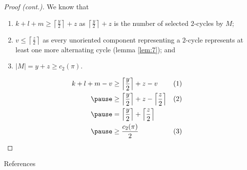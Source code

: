 \documentclass{beamer}
\theoremstyle{definition}
\begin{document}
\begin{frame}

\begin{proof}[Proof (cont.)]
We know that
\begin{enumerate}
    \item $k+l+m \geq \left\lceil \frac{y}{2} \right\rceil + z$ as $\left\lceil \frac{y}{2} \right\rceil + z$ is the number of selected $2$-cycles by $M$\pause;
    \item $v \leq \left\lceil \frac{z}{2} \right\rceil$ as every unoriented component representing a $2$-cycle represents at least one more alternating cycle (lemma \ref{lem:7})\pause; and
    \item $|M| = y+z \geq c_2(\pi)$.
\end{enumerate}\pause
\begin{align*}
    k+l+m-v &\geq \left\lceil \frac{y}{2} \right\rceil + z - v                                          & (1) \\ \pause
            &\geq \left\lceil \frac{y}{2} \right\rceil + z - \left\lceil \frac{z}{2} \right\rceil       & (2) \\ \pause
            &= \left\lceil \frac{y}{2} \right\rceil + \left\lceil \frac{z}{2} \right\rceil \\ \pause
            &\geq \frac{c_2(\pi)}{2}                                                                    & (3)
\end{align*}
\end{proof}

\end{frame}

\begin{frame}[allowframebreaks]{References}

\printbibliography

\end{frame}
\end{document}
